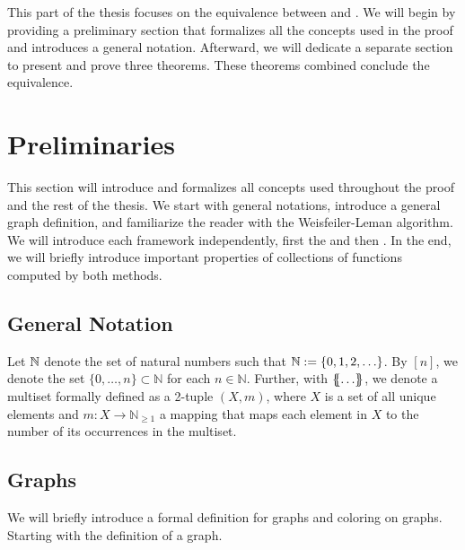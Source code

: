 This part of the thesis focuses on the equivalence between \wlnn and \gnn. We will begin by providing a preliminary section that formalizes all the concepts used in the proof and introduces a general notation. Afterward, we will dedicate a separate section to present and prove three theorems. These theorems combined conclude the equivalence.

\section{Preliminaries}\label{sec:pre_lim}
This section will introduce and formalizes all concepts used throughout the proof and the rest of the thesis. We start with general notations, introduce a general graph definition, and familiarize the reader with the Weisfeiler-Leman algorithm. We will introduce each framework independently, first the \wlnn and then \gnn. In the end, we will briefly introduce important properties of collections of functions computed by both methods.

\subsection{General Notation}
Let $\mathbb{N}$ denote the set of natural numbers such that $\mathbb{N} := \{0, 1,2, \ldots \}$. By $[n]$, we denote the set $\{0, \ldots, n\} \subset \mathbb{N}$ for each $n \in \mathbb{N}$. Further, with $\{\!\!\{ \ldots \}\!\!\}$, we denote a multiset formally defined as a 2-tuple $(X, m)$, where $X$ is a set of all unique elements and $m: X \rightarrow \mathbb{N}_{\geq 1}$ a mapping that maps each element in $X$ to the number of its occurrences in the multiset.

\subsection{Graphs}
We will briefly introduce a formal definition for graphs and coloring on graphs. Starting with the definition of a graph.

